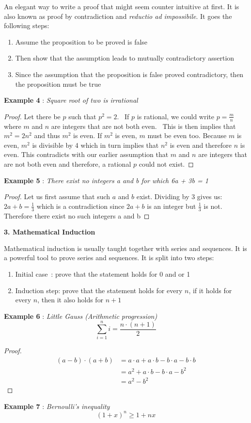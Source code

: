 \noindent An elegant way to write a proof that might seem counter intuitive at first. It is also known as proof by contradiction and \textit{reductio ad impossibile}. It goes the following steps:
\begin{enumerate}
\item Assume the proposition to be proved is false
\item Then show that the assumption leads to mutually contradictory assertion
\item Since the assumption that the proposition is false proved contradictory, then the proposition must be true
\end{enumerate}

\noindent\textbf{Example 4} : \textit{Square root of two is irrational}
\begin{proof}
Let there be $p$ such that $p^2=2$. 
If $p$ is rational, we could write $p = \frac{m}{n}$ where $m$ and $n$ are integers that are not both even. 
This is then implies that $m^2=2n^2$ and thus $m^2$ is even. If $m^2$ is even, $m$ must be even too. Because $m$ is even, $m^2$ is divisible by 4 which in turn implies that $n^2$ is even and therefore $n$ is even.
This contradicts with our earlier assumption that $m$ and $n$ are integers that are not both even and therefore, a rational $p$ could not exist.
\end{proof}

\noindent\textbf{Example 5} : \textit{There exist no integers a and b for which 6a + 3b = 1}
\begin{proof}
Let us first assume that such $a$ and $b$ exist.
Dividing by 3 gives us: $2a+b=\frac{1}{3}$
which is a contradiction since $2a+b$ is an integer but $\frac{1}{3}$ is not. Therefore there exist no such integers a and b
\end{proof}

\noindent \textbf{3. Mathematical Induction}

\noindent Mathematical induction is usually taught together with series and sequences. It is a powerful tool to prove series and sequences. It is split into two steps:
\begin{enumerate}
\item Initial case : prove that the statement holds for 0 and or 1
\item Induction step: prove that the statement holds for every $n$, if it holds for every $n$, then it also holds for $n+1$
\end{enumerate}

\noindent\textbf{Example 6} : \textit{Little Gauss (Arithmetic progression)}
\begin{equation}
\sum_{i=1}^n i= \frac{n\cdot(n+1)}{2}
\end{equation}
\begin{proof}
\begin{align}
(a-b)\cdot (a+b)&= a\cdot a+a\cdot b-b \cdot a-b \cdot b\\ 
			&= a^2+a \cdot b-b \cdot a-b^2\\ 
			&= a^2-b^2 
\end{align}
\end{proof}
\noindent\textbf{Example 7} : \textit{Bernoulli's inequality}
\begin{equation}
(1+x)^n \ge 1+nx
\end{equation}
